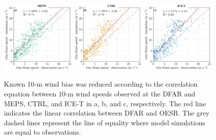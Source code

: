 \documentclass{ametsocV5}
\begin{document}
\begin{figure}
	\noindent\includegraphics[width=\textwidth,angle=0]{fig6.png}\\
	\caption{Known 10-m wind bias \citep{frogner_convection-permitting_2019} was reduced according to the correlation equation between 10-m wind speeds observed at the DFAR and MEPS, CTRL, and ICE-T in a, b, and c, respectively. The red line indicates the linear correlation between DFAR and OESR. The grey dashed lines represent the line of equality where model simulations are equal to observations. 
	}
	\label{fig:WS_correlation}
\end{figure}
\end{document}
